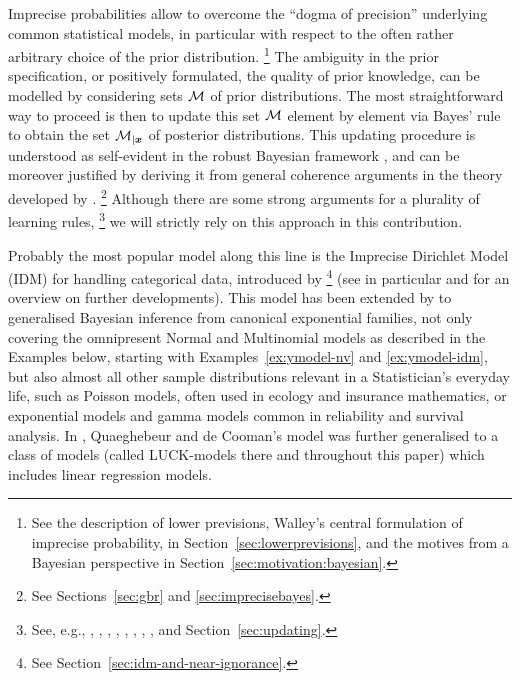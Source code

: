 
Imprecise probabilities allow to overcome the ``dogma of
precision'' \parencite[\S 5]{1991:walley}
underlying common statistical models, in particular with respect to the often rather arbitrary
choice of the prior distribution.%
\footnote{See the description of lower previsions,
Walley's central formulation of imprecise probability, in Section~\ref{sec:lowerprevisions},
and the motives from a Bayesian perspective in Section~\ref{sec:motivation:bayesian}.}
The ambiguity in the prior
specification, or positively formulated, the quality of prior
knowledge, can be modelled by considering sets ${\cal M}$ of prior distributions.
The most straightforward way to proceed is then to update this set ${\cal M}$
element by element via Bayes' rule %
to obtain the set ${\cal M}_{|{\bm x}}$ of posterior distributions. This
updating procedure is understood as self-evident in the robust
Bayesian framework \parencite[e.g.,][]{2000:rios}, and can be moreover
justified by deriving it from general coherence arguments in the
theory developed by \textcite{1991:walley}.%
\footnote{See Sections~\ref{sec:gbr} and \ref{sec:imprecisebayes}.}
Although there are some
strong arguments for a plurality of learning rules,%
\footnote{See, e.g.,
\textcite{2009:Coolen:Augustin}, \textcite{2007:weichselberger}, \textcite{2007a:cattaneo},
\textcite{2007:held}, \textcite{2007:held-isipta07}, \textcite{2009:Coolen:Augustin},
\textcite{2004:augustin:coolen}, \textcite{2003:augustin}, and Section~\ref{sec:updating}.} we
will strictly rely on this approach in this contribution.


Probably the most popular model along this line is the Imprecise
Dirichlet Model (IDM) for handling categorical data, introduced by
\textcite{1996:walley::idm}%
\footnote{See Section~\ref{sec:idm-and-near-ignorance}.}
(see in particular \textcite{2005:bernard} and \textcite{2009:bernard} %
for an overview on further developments). This model has been
extended by \textcite{2005:quaeghebeurcooman} to generalised Bayesian inference from
canonical exponential families, not only covering the
omnipresent Normal and Multinomial models as described in the
Examples below, starting with Examples~\ref{ex:ymodel-nv} and \ref{ex:ymodel-idm},
but also almost all other sample distributions relevant in a Statistician's everyday life, such as
Poisson models, often used in ecology and insurance mathematics, or
exponential models and gamma models common in reliability and
survival analysis. In \textcite{Walter2007a}, Quaeghebeur and de
Cooman's model was further generalised to a class of models (called
LUCK-models there and throughout this paper) which includes
linear regression models.

